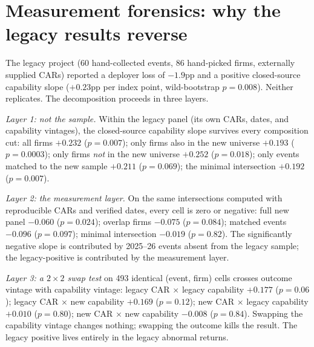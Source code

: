 \documentclass[review,12pt,authoryear]{elsarticle}
\begin{document}
\section{Measurement forensics: why the legacy results reverse}\label{app:forensics}

The legacy project (60 hand-collected events, 86 hand-picked firms,
externally supplied CARs) reported a deployer loss of $-1.9$pp and a positive
closed-source capability slope ($+0.23$pp per index point, wild-bootstrap
$p=0.008$). Neither replicates. The decomposition proceeds in three layers.

\emph{Layer 1: not the sample.} Within the legacy panel (its own CARs, dates,
and capability vintages), the closed-source capability slope survives every
composition cut: all firms $+0.232$ ($p=0.007$); only firms also in the new
universe $+0.193$ ($p=0.0003$); only firms \emph{not} in the new universe
$+0.252$ ($p=0.018$); only events matched to the new sample $+0.211$
($p=0.069$); the minimal intersection $+0.192$ ($p=0.007$).

\emph{Layer 2: the measurement layer.} On the same intersections computed
with reproducible CARs and verified dates, every cell is zero or negative:
full new panel $-0.060$ ($p=0.024$); overlap firms $-0.075$ ($p=0.084$);
matched events $-0.096$ ($p=0.097$); minimal intersection $-0.019$
($p=0.82$). The significantly negative slope is contributed by 2025--26
events absent from the legacy sample; the legacy-positive is contributed by
the measurement layer.

\emph{Layer 3: a $2\times2$ swap test} on 493 identical (event, firm) cells
crosses outcome vintage with capability vintage: legacy CAR $\times$ legacy
capability $+0.177$ ($p=0.06$); legacy CAR $\times$ new capability $+0.169$
($p=0.12$); new CAR $\times$ legacy capability $+0.010$ ($p=0.80$); new CAR
$\times$ new capability $-0.008$ ($p=0.84$). Swapping the capability vintage
changes nothing; swapping the outcome kills the result. The legacy positive
lives entirely in the legacy abnormal returns.
\end{document}
